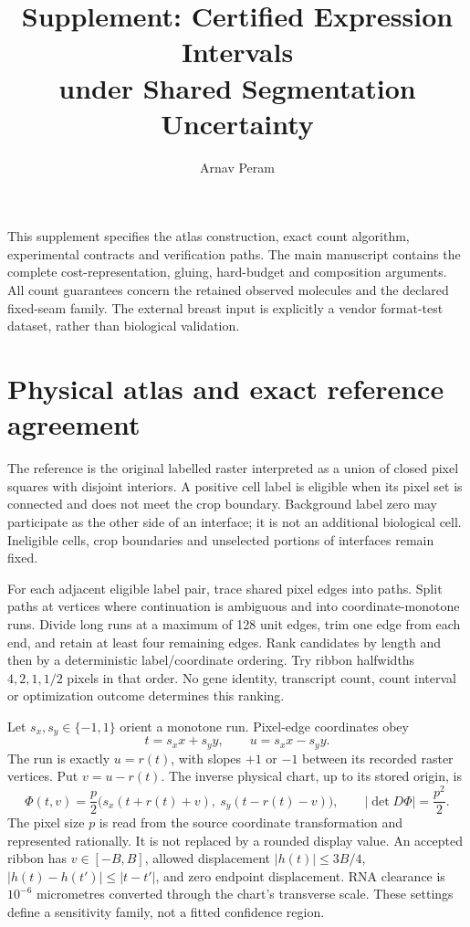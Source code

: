 \documentclass[10pt,letterpaper]{article}
\title{Supplement: Certified Expression Intervals\\under Shared Segmentation Uncertainty}
\author{Arnav Peram}\date{}
\begin{document}
\maketitle
This supplement specifies the atlas construction, exact count algorithm, experimental contracts and verification paths. The main manuscript contains the complete cost-representation, gluing, hard-budget and composition arguments. All count guarantees concern the retained observed molecules and the declared fixed-seam family. The external breast input is explicitly a vendor format-test dataset, rather than biological validation.

\section{Physical atlas and exact reference agreement}
The reference is the original labelled raster interpreted as a union of closed pixel squares with disjoint interiors. A positive cell label is eligible when its pixel set is connected and does not meet the crop boundary. Background label zero may participate as the other side of an interface; it is not an additional biological cell. Ineligible cells, crop boundaries and unselected portions of interfaces remain fixed.

For each adjacent eligible label pair, trace shared pixel edges into paths. Split paths at vertices where continuation is ambiguous and into coordinate-monotone runs. Divide long runs at a maximum of 128 unit edges, trim one edge from each end, and retain at least four remaining edges. Rank candidates by length and then by a deterministic label/coordinate ordering. Try ribbon halfwidths $4,2,1,1/2$ pixels in that order. No gene identity, transcript count, count interval or optimization outcome determines this ranking.

Let $s_x,s_y\in\{-1,1\}$ orient a monotone run. Pixel-edge coordinates obey
\[
 t=s_xx+s_yy,\qquad u=s_xx-s_yy.
\]
The run is exactly $u=r(t)$, with slopes $+1$ or $-1$ between its recorded raster vertices. Put $v=u-r(t)$. The inverse physical chart, up to its stored origin, is
\[
 \Phi(t,v)=\frac p2\bigl(s_x(t+r(t)+v),\ s_y(t-r(t)-v)\bigr),
 \qquad |\det D\Phi|=\frac{p^2}{2}.
\]
The pixel size $p$ is read from the source coordinate transformation and represented rationally. It is not replaced by a rounded display value. An accepted ribbon has $v\in[-B,B]$, allowed displacement $|h(t)|\le3B/4$, $|h(t)-h(t')|\le|t-t'|$, and zero endpoint displacement. RNA clearance is $10^{-6}$ micrometres converted through the chart's transverse scale. These settings define a sensitivity family, not a fitted confidence region.
\end{document}
